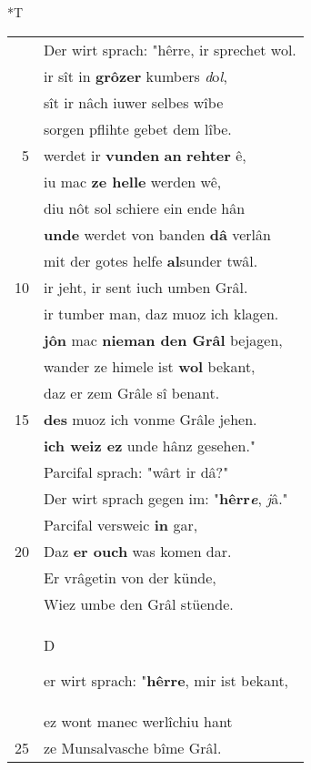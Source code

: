 \documentclass[8pt,a4paper,notitlepage]{article}
\begin{document}
\begin{table}[ht]
\begin{minipage}[t]{0.5\linewidth}
\end{minipage}
\hspace{0.5cm}
\begin{minipage}[t]{0.5\linewidth}
\small
\begin{center}*T
\end{center}
\begin{tabular}{rl}
 & Der wirt sprach: "hêrre, ir sprechet wol.\\ 
 & ir sît in \textbf{grôzer} kumbers \textit{d}o\textit{l},\\ 
 & sît ir nâch iuwer selbes wîbe\\ 
 & sorgen pflihte gebet dem lîbe.\\ 
5 & werdet ir \textbf{vunden} \textbf{an} \textbf{rehter} ê,\\ 
 & iu mac \textbf{ze helle} werden wê,\\ 
 & diu nôt sol schiere ein ende hân\\ 
 & \textbf{unde} werdet von banden \textbf{dâ} verlân\\ 
 & mit der gotes helfe \textbf{al}sunder twâl.\\ 
10 & ir jeht, ir sent iuch umben Grâl.\\ 
 & ir tumber man, daz muoz ich klagen.\\ 
 & \textbf{jô}\textbf{n} mac \textbf{nieman den Grâl} bejagen,\\ 
 & wander ze himele ist \textbf{wol} bekant,\\ 
 & daz er zem Grâle sî benant.\\ 
15 & \textbf{des} muoz ich vonme Grâle jehen.\\ 
 & \textbf{ich weiz ez} unde hânz gesehen."\\ 
 & Parcifal sprach: "wârt ir dâ?"\\ 
 & Der wirt sprach gegen im: "\textbf{hêrr\textit{e}}, \textit{j}â."\\ 
 & Parcifal versweic \textbf{in} gar,\\ 
20 & Daz \textbf{er ouch} was komen dar.\\ 
 & Er vrâgetin von der künde,\\ 
 & Wiez umbe den Grâl stüende.\\ 
 & \begin{large}D\end{large}er wirt sprach: "\textbf{hêrre}, mir ist bekant,\\ 
 & ez wont manec werlîchiu hant\\ 
25 & ze Munsalvasche bîme Grâl.\\ 

\end{tabular}
\end{minipage}
\end{table}
\end{document}
